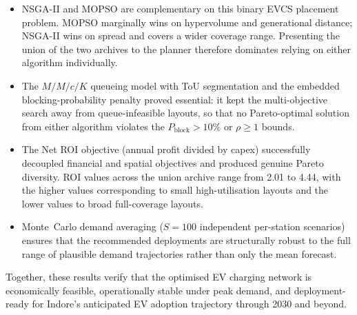 \begin{itemize}
    \item NSGA-II and MOPSO are complementary on this binary EVCS
          placement problem. MOPSO marginally wins on hypervolume
          and generational distance; NSGA-II wins on spread and
          covers a wider coverage range. Presenting the union of
          the two archives to the planner therefore dominates
          relying on either algorithm individually.
    \item The $M/M/c/K$ queueing model with ToU segmentation and
          the embedded blocking-probability penalty proved
          essential: it kept the multi-objective search away from
          queue-infeasible layouts, so that no Pareto-optimal
          solution from either algorithm violates the
          $P_{\text{block}} > 10\%$ or $\rho \ge 1$ bounds.
    \item The Net ROI objective (annual profit divided by capex)
          successfully decoupled financial and spatial objectives
          and produced genuine Pareto diversity. ROI values across
          the union archive range from 2.01 to 4.44, with the
          higher values corresponding to small high-utilisation
          layouts and the lower values to broad full-coverage
          layouts.
    \item Monte~Carlo demand averaging ($S = 100$ independent
          per-station scenarios) ensures that the recommended
          deployments are structurally robust to the full range
          of plausible demand trajectories rather than only the
          mean forecast.
\end{itemize}

Together, these results verify that the optimised EV charging
network is economically feasible, operationally stable under peak
demand, and deployment-ready for Indore's anticipated EV adoption
trajectory through 2030 and beyond.
